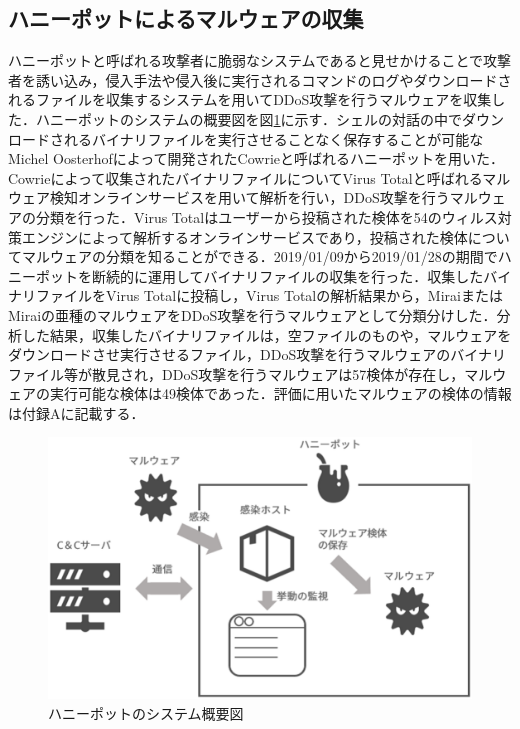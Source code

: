 \subsection{ハニーポットによるマルウェアの収集}
ハニーポットと呼ばれる攻撃者に脆弱なシステムであると見せかけることで攻撃者を誘い込み，侵入手法や侵入後に実行されるコマンドのログやダウンロードされるファイルを収集するシステムを用いてDDoS攻撃を行うマルウェアを収集した．ハニーポットのシステムの概要図を図\ref{fig:honey}に示す．シェルの対話の中でダウンロードされるバイナリファイルを実行させることなく保存することが可能なMichel Oosterhofによって開発されたCowrie\cite{Cowrie}と呼ばれるハニーポットを用いた．Cowrieによって収集されたバイナリファイルについてVirus Totalと呼ばれるマルウェア検知オンラインサービスを用いて解析を行い，DDoS攻撃を行うマルウェアの分類を行った．Virus Total\cite{Virus}はユーザーから投稿された検体を54のウィルス対策エンジンによって解析するオンラインサービスであり，投稿された検体についてマルウェアの分類を知ることができる．2019/01/09から2019/01/28の期間でハニーポットを断続的に運用してバイナリファイルの収集を行った．収集したバイナリファイルをVirus Totalに投稿し，Virus Totalの解析結果から，MiraiまたはMiraiの亜種のマルウェアをDDoS攻撃を行うマルウェアとして分類分けした．分析した結果，収集したバイナリファイルは，空ファイルのものや，マルウェアをダウンロードさせ実行させるファイル，DDoS攻撃を行うマルウェアのバイナリファイル等が散見され，DDoS攻撃を行うマルウェアは57検体が存在し，マルウェアの実行可能な検体は49検体であった．評価に用いたマルウェアの検体の情報は付録Aに記載する．
\begin{figure}[h]
    \centering
       \includegraphics[width=120mm]{figures/honey.eps}
    \caption{ハニーポットのシステム概要図}
    \label{fig:honey}
\end{figure}

